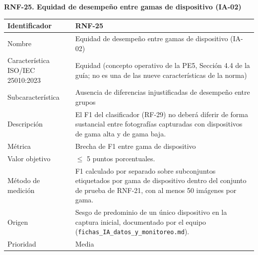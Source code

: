 \documentclass[12pt,a4paper]{article}
\begin{document}
\begin{minipage}{\linewidth}
\bigskip
\noindent\textbf{RNF-25. Equidad de desempeño entre gamas de dispositivo (IA-02)}
\label{tab:RNF-25}

\begin{center}
\begin{tabular}{|p{4.2cm}|p{10cm}|}
\hline
Identificador & RNF-25 \\
\hline
Nombre & Equidad de desempeño entre gamas de dispositivo (IA-02) \\
\hline
Característica ISO/IEC 25010:2023 & Equidad (concepto operativo de la PE5, Sección 4.4 de la guía; no es una de las nueve características de la norma) \\
\hline
Subcaracterística & Ausencia de diferencias injustificadas de desempeño entre grupos \\
\hline
Descripción & El F1 del clasificador (RF-29) no deberá diferir de forma sustancial entre fotografías capturadas con dispositivos de gama alta y de gama baja. \\
\hline
Métrica & Brecha de F1 entre gama de dispositivo \\
\hline
Valor objetivo & $\leq$ 5 puntos porcentuales. \\
\hline
Método de medición & F1 calculado por separado sobre subconjuntos etiquetados por gama de dispositivo dentro del conjunto de prueba de RNF-21, con al menos 50 imágenes por gama. \\
\hline
Origen & Sesgo de predominio de un único dispositivo en la captura inicial, documentado por el equipo (\texttt{fichas\_IA\_datos\_y\_monitoreo.md}). \\
\hline
Prioridad & Media \\
\hline
\end{tabular}
\end{center}
\end{minipage}
\end{document}

